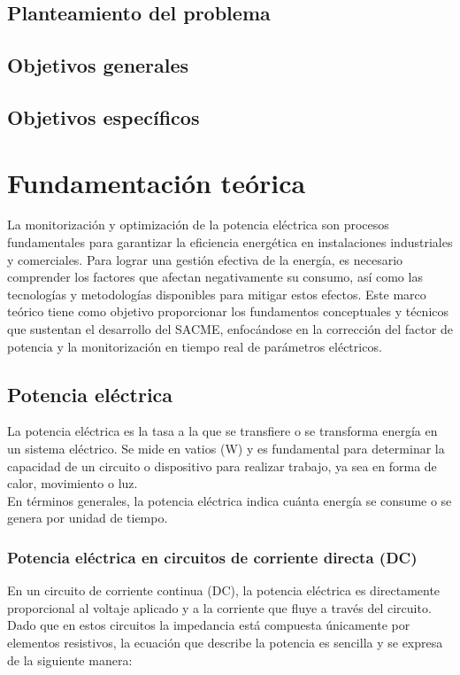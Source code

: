 \documentclass{report}          %
\newcommand{\shortname}     {SACME}
\begin{document}
        \section{Planteamiento del problema}

        \section{Objetivos generales}

        \section{Objetivos específicos}


    \chapter{Fundamentación teórica}  
        La monitorización y optimización de la potencia eléctrica son procesos fundamentales para garantizar la eficiencia energética en instalaciones industriales y comerciales. Para lograr una gestión efectiva de la energía, es necesario comprender los factores que afectan negativamente su consumo, así como las tecnologías y metodologías disponibles para mitigar estos efectos. Este marco teórico tiene como objetivo proporcionar los fundamentos conceptuales y técnicos que sustentan el desarrollo del \shortname, enfocándose en la corrección del factor de potencia y la monitorización en tiempo real de parámetros eléctricos.
    
        \section{Potencia eléctrica}
            La potencia eléctrica es la tasa a la que se transfiere o se transforma energía en un sistema eléctrico. Se mide en vatios (W) y es fundamental para determinar la capacidad de un circuito o dispositivo para realizar trabajo, ya sea en forma de calor, movimiento o luz.\\
            En términos generales, la potencia eléctrica indica cuánta energía se consume o se genera por unidad de tiempo.
            
            \subsection{Potencia eléctrica en circuitos de corriente directa (DC)}
            En un circuito de corriente continua (DC), la potencia eléctrica es directamente proporcional al voltaje aplicado y a la corriente que fluye a través del circuito. Dado que en estos circuitos la impedancia está compuesta únicamente por elementos resistivos, la ecuación que describe la potencia es sencilla y se expresa de la siguiente manera:
\end{document}
